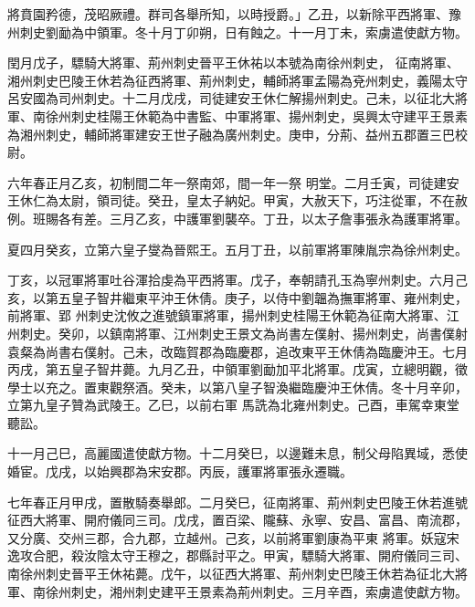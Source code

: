 \begin{pinyinscope}
 將賁園矜德，茂昭厥禮。群司各舉所知，以時授爵。」乙丑，以新除平西將軍、豫州刺史劉勔為中領軍。冬十月丁卯朔，日有蝕之。十一月丁未，索虜遣使獻方物。



 閏月戊子，驃騎大將軍、荊州刺史晉平王休祐以本號為南徐州刺史，
 征南將軍、湘州刺史巴陵王休若為征西將軍、荊州刺史，輔師將軍孟陽為兗州刺史，義陽太守呂安國為司州刺史。十二月戊戌，司徒建安王休仁解揚州刺史。己未，以征北大將軍、南徐州刺史桂陽王休範為中書監、中軍將軍、揚州刺史，吳興太守建平王景素為湘州刺史，輔師將軍建安王世子融為廣州刺史。庚申，分荊、益州五郡置三巴校尉。



 六年春正月乙亥，初制間二年一祭南郊，間一年一祭
 明堂。二月壬寅，司徒建安王休仁為太尉，領司徒。癸丑，皇太子納妃。甲寅，大赦天下，巧注從軍，不在赦例。班賜各有差。三月乙亥，中護軍劉襲卒。丁丑，以太子詹事張永為護軍將軍。



 夏四月癸亥，立第六皇子燮為晉熙王。五月丁丑，以前軍將軍陳胤宗為徐州刺史。



 丁亥，以冠軍將軍吐谷渾拾虔為平西將軍。戊子，奉朝請孔玉為寧州刺史。六月己亥，以第五皇子智井繼東平沖王休倩。庚子，以侍中劉韞為撫軍將軍、雍州刺史，前將軍、郢
 州刺史沈攸之進號鎮軍將軍，揚州刺史桂陽王休範為征南大將軍、江州刺史。癸卯，以鎮南將軍、江州刺史王景文為尚書左僕射、揚州刺史，尚書僕射袁粲為尚書右僕射。己未，改臨賀郡為臨慶郡，追改東平王休倩為臨慶沖王。七月丙戌，第五皇子智井薨。九月乙丑，中領軍劉勔加平北將軍。戊寅，立總明觀，徵學士以充之。置東觀祭酒。癸未，以第八皇子智渙繼臨慶沖王休倩。冬十月辛卯，立第九皇子贊為武陵王。乙巳，以前右軍
 馬詵為北雍州刺史。己酉，車駕幸東堂聽訟。



 十一月己巳，高麗國遣使獻方物。十二月癸巳，以邊難未息，制父母陷異域，悉使婚宦。戊戌，以始興郡為宋安郡。丙辰，護軍將軍張永遷職。



 七年春正月甲戌，置散騎奏舉郎。二月癸巳，征南將軍、荊州刺史巴陵王休若進號征西大將軍、開府儀同三司。戊戌，置百梁、隴蘇、永寧、安昌、富昌、南流郡，又分廣、交州三郡，合九郡，立越州。己亥，以前將軍劉康為平東
 將軍。妖寇宋逸攻合肥，殺汝陰太守王穆之，郡縣討平之。甲寅，驃騎大將軍、開府儀同三司、南徐州刺史晉平王休祐薨。戊午，以征西大將軍、荊州刺史巴陵王休若為征北大將軍、南徐州刺史，湘州刺史建平王景素為荊州刺史。三月辛酉，索虜遣使獻方物。




\end{pinyinscope}
